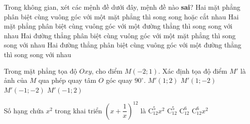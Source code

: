 \begin{ex}%
Trong không gian, xét các mệnh đề dưới đây, mệnh đề nào \textbf{sai}?
	\choice
	{Hai mặt phẳng phân biệt cùng vuông góc với một mặt phẳng thì song song hoặc cắt nhau}
	{Hai mặt phẳng phân biệt cùng vuông góc với một đường thẳng thì song song với nhau}
	{Hai đường thẳng phân biệt cùng vuông góc với một mặt phẳng thì song song với nhau}
	{\True Hai đường thẳng phân biệt cùng vuông góc với một đường thẳng thì song song với nhau}
\end{ex}

























\begin{ex}%
Trong mặt phẳng tọa độ $Oxy$, cho điểm $M(-2;1)$. Xác định tọa độ điểm $M'$ là ảnh của $M$ qua phép quay tâm $O$ góc quay $90^\circ$.
\choice
{$M'(1;2)$}
{$M'(1;-2)$}
{\True $M'(-1;-2)$}
{$M'(-1;2)$}
\end{ex}

\begin{ex}%
Số hạng chứa $x^2$ trong khai triển $\left(x+\dfrac{1}{x}\right)^{12}$ là
\choice
{\True $\mathrm{C}^5_{12}x^2$}
{$\mathrm{C}^5_{12}$}
{$\mathrm{C}^6_{12}$}
{$\mathrm{C}^6_{12}x^2$}
\end{ex}

